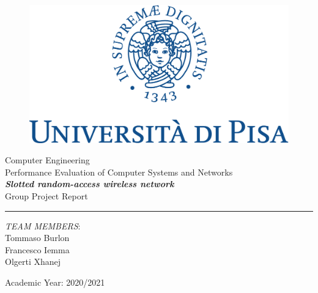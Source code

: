 \documentclass[]{report}
\begin{document}
\begin{titlepage}
	\begin{center}
		\begin{figure}
			\includegraphics[width=\textwidth]{img/marchio_unipi_pant541-eps-converted-to.pdf}         
		\end{figure}
		{\Large
			Computer Engineering\\
			\vspace{5mm} %
			Performance Evaluation of Computer Systems and Networks}\\
		\vspace{30mm} %
		{\Huge\textbf{\textit{Slotted random-access wireless network}}}\\
		\vspace{10mm} %
		{\Large Group Project Report}\\
		\par\noindent\rule{\textwidth}{0.4pt}
		\begin{flushright}
			\textit{TEAM MEMBERS}:\\
			Tommaso Burlon\\ 
			Francesco Iemma\\ 
			Olgerti Xhanej\\
			
		\end{flushright}
		\vfill
		Academic Year: 2020/2021\\        
	\end{center}
\end{titlepage} 
\tableofcontents


\end{document}
